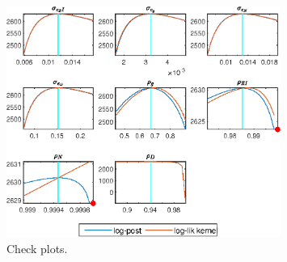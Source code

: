  
\begin{figure}[H]
\centering 
\includegraphics[width=0.80\textwidth]{BRS_growth_alt/graphs/BRS_growth_alt_CheckPlots1}
\caption{Check plots.}\label{Fig:CheckPlots:1}
\end{figure}
 
